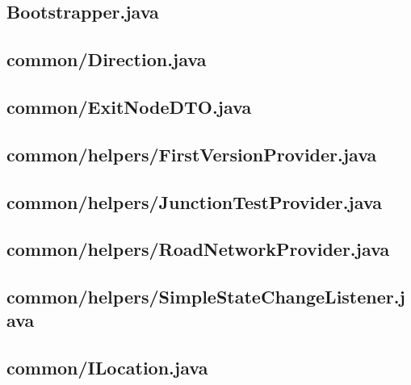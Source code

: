
\newpage
\subsection{Bootstrapper.java}

\newpage
\subsection{common/Direction.java}

\newpage
\subsection{common/ExitNodeDTO.java}

\newpage
\subsection{common/helpers/FirstVersionProvider.java}

\newpage
\subsection{common/helpers/JunctionTestProvider.java}

\newpage
\subsection{common/helpers/RoadNetworkProvider.java}

\newpage
\subsection{common/helpers/SimpleStateChangeListener.java}

\newpage
\subsection{common/ILocation.java}

\newpage
